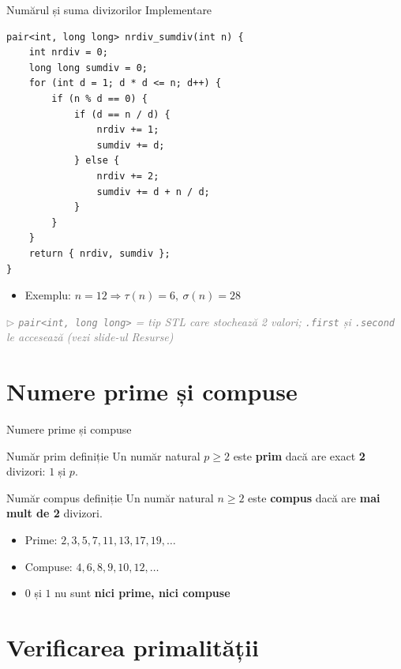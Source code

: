 ﻿\documentclass{beamer}
\newcommand{\beginnote}[1]{%
  \vfill
  {\footnotesize\textcolor{gray}{\textit{$\triangleright$ #1 (vezi slide-ul \emph{Resurse})}}}%
}
\begin{document}
\begin{frame}{Numărul și suma divizorilor \textemdash{} Implementare}
  \begin{lstlisting}
pair<int, long long> nrdiv_sumdiv(int n) {
    int nrdiv = 0;
    long long sumdiv = 0;
    for (int d = 1; d * d <= n; d++) {
        if (n % d == 0) {
            if (d == n / d) {
                nrdiv += 1;
                sumdiv += d;
            } else {
                nrdiv += 2;
                sumdiv += d + n / d;
            }
        }
    }
    return { nrdiv, sumdiv };
}
  \end{lstlisting}
  \begin{itemize}
    \item Exemplu: $n=12 \Rightarrow \tau(n)=6,\ \sigma(n)=28$
  \end{itemize}
  \beginnote{\lstinline|pair<int, long long>| = tip STL care stochează 2 valori; \lstinline|.first| și \lstinline|.second| le accesează}
\end{frame}

\section{Numere prime și compuse}

\begin{frame}{Numere prime și compuse}
  \bigskip
  \begin{block}{Număr prim \textemdash{} definiție}
    Un număr natural $p \geq 2$ este \textbf{prim} dacă are exact \textbf{2} divizori: $1$ și $p$.
  \end{block}
  \begin{block}{Număr compus \textemdash{} definiție}
    Un număr natural $n \geq 2$ este \textbf{compus} dacă are \textbf{mai mult de 2} divizori.
  \end{block}
  \bigskip
  \begin{itemize}
    \item Prime: $2, 3, 5, 7, 11, 13, 17, 19, \ldots$
    \item Compuse: $4, 6, 8, 9, 10, 12, \ldots$
    \item $0$ și $1$ nu sunt \textbf{nici prime, nici compuse}
  \end{itemize}
\end{frame}

\section{Verificarea primalității}
\end{document}
